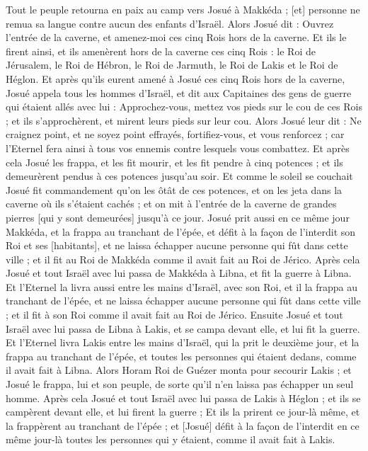 \begin{multicols}{2}
Tout le peuple retourna en paix au camp vers Josué à Makkéda ; [et] personne ne remua sa langue contre aucun des enfants d'Israël.
Alors Josué dit : Ouvrez l'entrée de la caverne, et amenez-moi ces cinq Rois hors de la caverne.
Et ils le firent ainsi, et ils amenèrent hors de la caverne ces cinq Rois : le Roi de Jérusalem, le Roi de Hébron, le Roi de Jarmuth, le Roi de Lakis et le Roi de Héglon.
Et après qu'ils eurent amené à Josué ces cinq Rois hors de la caverne, Josué appela tous les hommes d'Israël, et dit aux Capitaines des gens de guerre qui étaient allés avec lui : Approchez-vous, mettez vos pieds sur le cou de ces Rois ; et ils s'approchèrent, et mirent leurs pieds sur leur cou.
Alors Josué leur dit : Ne craignez point, et ne soyez point effrayés, fortifiez-vous, et vous renforcez ; car l'Eternel fera ainsi à tous vos ennemis contre lesquels vous combattez.
Et après cela Josué les frappa, et les fit mourir, et les fit pendre à cinq potences ; et ils demeurèrent pendus à ces potences jusqu'au soir.
Et comme le soleil se couchait Josué fit commandement qu'on les ôtât de ces potences, et on les jeta dans la caverne où ils s'étaient cachés ; et on mit à l'entrée de la caverne de grandes pierres [qui y sont demeurées] jusqu'à ce jour.
Josué prit aussi en ce même jour Makkéda, et la frappa au tranchant de l'épée, et défit à la façon de l'interdit son Roi et ses [habitants], et ne laissa échapper aucune personne qui fût dans cette ville ; et il fit au Roi de Makkéda comme il avait fait au Roi de Jérico.
Après cela Josué et tout Israël avec lui passa de Makkéda à Libna, et fit la guerre à Libna.
Et l'Eternel la livra aussi entre les mains d'Israël, avec son Roi, et il la frappa au tranchant de l'épée, et ne laissa échapper aucune personne qui fût dans cette ville ; et il fit à son Roi comme il avait fait au Roi de Jérico.
Ensuite Josué et tout Israël avec lui passa de Libna à Lakis, et se campa devant elle, et lui fit la guerre.
Et l'Eternel livra Lakis entre les mains d'Israël, qui la prit le deuxième jour, et la frappa au tranchant de l'épée, et toutes les personnes qui étaient dedans, comme il avait fait à Libna.
Alors Horam Roi de Guézer monta pour secourir Lakis ; et Josué le frappa, lui et son peuple, de sorte qu'il n'en laissa pas échapper un seul homme.
Après cela Josué et tout Israël avec lui passa de Lakis à Héglon ; et ils se campèrent devant elle, et lui firent la guerre ;
Et ils la prirent ce jour-là même, et la frappèrent au tranchant de l'épée ; et [Josué] défit à la façon de l'interdit en ce même jour-là toutes les personnes qui y étaient, comme il avait fait à Lakis.

\end{multicols}
